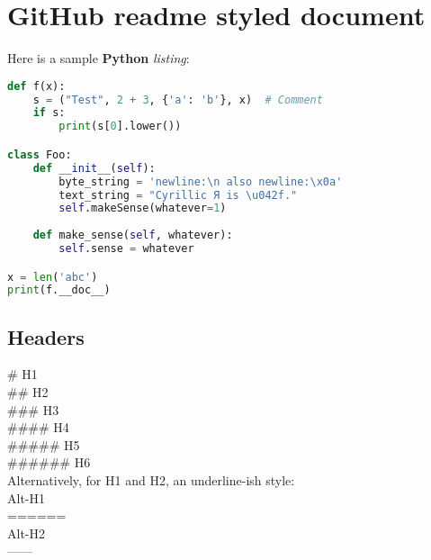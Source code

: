

\pagestyle{plain}  %

\setcounter{secnumdepth}{0}  %



\section{GitHub readme styled document}

Here is a sample {\bf Python} {\it listing}:

\begin{lstlisting}[language=Python]
def f(x):
	s = ("Test", 2 + 3, {'a': 'b'}, x)  # Comment
	if s:
		print(s[0].lower())

class Foo:
	def __init__(self):
		byte_string = 'newline:\n also newline:\x0a'
		text_string = "Cyrillic Я is \u042f."
		self.makeSense(whatever=1)
	
	def make_sense(self, whatever):
		self.sense = whatever

x = len('abc')
print(f.__doc__)
\end{lstlisting}

\subsection{Headers}

\begin{mdframed}
\# H1 \\
\#\# H2 \\
\#\#\# H3 \\
\#\#\#\# H4 \\
\#\#\#\#\# H5 \\
\#\#\#\#\#\# H6 \\

Alternatively, for H1 and H2, an underline-ish style: \\

Alt-H1 \\
====== \\

Alt-H2 \\
------
\end{mdframed}

